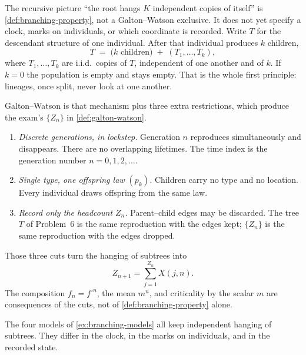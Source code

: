 \documentclass[11pt,a4paper]{article}
\begin{document}
\begin{remark}
\label{rem:branching-vs-gw}
The recursive picture ``the root hangs \(K\) independent copies of itself'' is \cref{def:branching-property}, not a Galton--Watson exclusive. It does not yet specify a clock, marks on individuals, or which coordinate is recorded. Write \(T\) for the descendant structure of one individual. After that individual produces \(k\) children,
\[
T
\;=\;
\bigl(\text{\(k\) children}\bigr)
\;+\;
(T_1,\dots,T_k),
\]
where \(T_1,\dots,T_k\) are i.i.d.\ copies of \(T\), independent of one another and of \(k\). If \(k=0\) the population is empty and stays empty. That is the whole first principle: lineages, once split, never look at one another.

Galton--Watson is that mechanism plus three extra restrictions, which produce the exam's \(\{Z_n\}\) in \cref{def:galton-watson}.
\begin{enumerate}[label=\textup{(\roman*)}]
    \item
    \emph{Discrete generations, in lockstep.} Generation \(n\) reproduces simultaneously and disappears. There are no overlapping lifetimes. The time index is the generation number \(n=0,1,2,\dots\).
    \item
    \emph{Single type, one offspring law \((p_k)\).} Children carry no type and no location. Every individual draws offspring from the same law.
    \item
    \emph{Record only the headcount \(Z_n\).} Parent--child edges may be discarded. The tree \(T\) of Problem~6 is the same reproduction with the edges kept; \(\{Z_n\}\) is the same reproduction with the edges dropped.
\end{enumerate}
Those three cuts turn the hanging of subtrees into
\[
Z_{n+1}
=
\sum_{j=1}^{Z_n} X(j,n).
\]
The composition \(f_n=f^{\circ n}\), the mean \(m^n\), and criticality by the scalar \(m\) are consequences of the cuts, not of \cref{def:branching-property} alone.

The four models of \cref{ex:branching-models} all keep independent hanging of subtrees. They differ in the clock, in the marks on individuals, and in the recorded state.


\end{remark}
\end{document}
